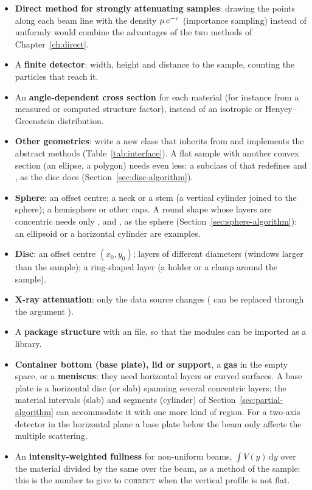 \begin{itemize}
  \item \textbf{Direct method for strongly attenuating samples}: drawing the points along each beam line with the density $\mu\operatorname{e}^{-\tau}$
        (importance sampling) instead of uniformly would combine the advantages of the two methods of Chapter~\ref{ch:direct}.
  \item A \textbf{finite detector}: width, height and distance to the sample, counting the particles that reach it.
  \item An \textbf{angle-dependent cross section} for each material (for instance from a measured or computed structure factor), instead of an isotropic or
        Henyey--Greenstein distribution.
  \item \textbf{Other geometries}: write a new class that inherits from  and implements the abstract methods (Table~\ref{tab:interface}).
        A flat sample with another convex section (an ellipse, a polygon) needs even less: a subclass of  that redefines
         and , as the disc does (Section~\ref{sec:disc-algorithm}).
  \item \textbf{Sphere}: an offset centre; a neck or a stem (a vertical cylinder joined to the sphere); a hemisphere or other
        caps. A round shape whose layers are concentric needs only ,  and
        , as the sphere (Section~\ref{sec:sphere-algorithm}): an ellipsoid or a horizontal cylinder are examples.
  \item \textbf{Disc}: an offset centre $(x_0,y_0)$; layers of different diameters (windows larger than the sample); a ring-shaped layer
        (a holder or a clamp around the sample).
  \item \textbf{X-ray attenuation}: only the data source changes ( can be replaced through the argument ).
  \item A \textbf{package structure} with an  file, so that the modules can be imported as a library.
  \item \textbf{Container bottom (base plate), lid or support}, a \textbf{gas} in the empty space, or a \textbf{meniscus}: they need horizontal layers or
        curved surfaces. A base plate is a horizontal disc (or slab) spanning several concentric layers; the material intervals (slab) and segments
        (cylinder) of Section~\ref{sec:partial-algorithm} can accommodate it with one more kind of region. For a two-axis detector in the
        horizontal plane a base plate below the beam only affects the multiple scattering.
  \item An \textbf{intensity-weighted fullness} for non-uniform beams, $\int V(y)\,\mathrm{d}y$ over the material divided by the same over the beam,
        as a method of the sample: this is the number to give to \textsc{correct} when the vertical profile is not flat.
\end{itemize}
